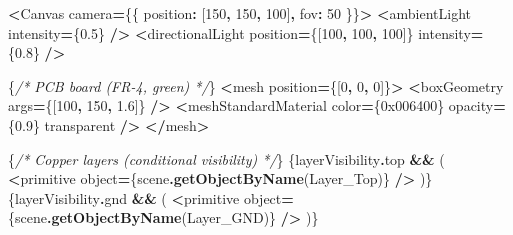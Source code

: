 \documentclass[
]{article}
\newenvironment{Shaded}{\begin{snugshade}}{\end{snugshade}}
\newcommand{\AttributeTok}[1]{\textcolor[rgb]{0.13,0.29,0.53}{#1}}
\newcommand{\BaseNTok}[1]{\textcolor[rgb]{0.00,0.00,0.81}{#1}}
\newcommand{\CommentTok}[1]{\textcolor[rgb]{0.56,0.35,0.01}{\textit{#1}}}
\newcommand{\DataTypeTok}[1]{\textcolor[rgb]{0.13,0.29,0.53}{#1}}
\newcommand{\DecValTok}[1]{\textcolor[rgb]{0.00,0.00,0.81}{#1}}
\newcommand{\FloatTok}[1]{\textcolor[rgb]{0.00,0.00,0.81}{#1}}
\newcommand{\FunctionTok}[1]{\textcolor[rgb]{0.13,0.29,0.53}{\textbf{#1}}}
\newcommand{\NormalTok}[1]{#1}
\newcommand{\OperatorTok}[1]{\textcolor[rgb]{0.81,0.36,0.00}{\textbf{#1}}}
\newcommand{\StringTok}[1]{\textcolor[rgb]{0.31,0.60,0.02}{#1}}
\begin{document}
\begin{Shaded}
\begin{Highlighting}[]
      \OperatorTok{\textless{}}\NormalTok{Canvas camera}\OperatorTok{=}\NormalTok{\{\{ position}\OperatorTok{:}\NormalTok{ [}\DecValTok{150}\OperatorTok{,} \DecValTok{150}\OperatorTok{,} \DecValTok{100}\NormalTok{]}\OperatorTok{,}\NormalTok{ fov}\OperatorTok{:} \DecValTok{50}\NormalTok{ \}\}}\OperatorTok{\textgreater{}}
        \OperatorTok{\textless{}}\NormalTok{ambientLight intensity}\OperatorTok{=}\NormalTok{\{}\FloatTok{0.5}\NormalTok{\} }\OperatorTok{/\textgreater{}}
        \OperatorTok{\textless{}}\NormalTok{directionalLight position}\OperatorTok{=}\NormalTok{\{[}\DecValTok{100}\OperatorTok{,} \DecValTok{100}\OperatorTok{,} \DecValTok{100}\NormalTok{]\} intensity}\OperatorTok{=}\NormalTok{\{}\FloatTok{0.8}\NormalTok{\} }\OperatorTok{/\textgreater{}}

\NormalTok{        \{}\CommentTok{/* PCB board (FR{-}4, green) */}\NormalTok{\}}
        \OperatorTok{\textless{}}\NormalTok{mesh position}\OperatorTok{=}\NormalTok{\{[}\DecValTok{0}\OperatorTok{,} \DecValTok{0}\OperatorTok{,} \DecValTok{0}\NormalTok{]\}}\OperatorTok{\textgreater{}}
          \OperatorTok{\textless{}}\NormalTok{boxGeometry args}\OperatorTok{=}\NormalTok{\{[}\DecValTok{100}\OperatorTok{,} \DecValTok{150}\OperatorTok{,} \FloatTok{1.6}\NormalTok{]\} }\OperatorTok{/\textgreater{}}
          \OperatorTok{\textless{}}\NormalTok{meshStandardMaterial color}\OperatorTok{=}\NormalTok{\{}\BaseNTok{0x006400}\NormalTok{\} opacity}\OperatorTok{=}\NormalTok{\{}\FloatTok{0.9}\NormalTok{\} transparent }\OperatorTok{/\textgreater{}}
        \OperatorTok{\textless{}/}\NormalTok{mesh}\OperatorTok{\textgreater{}}

\NormalTok{        \{}\CommentTok{/* Copper layers (conditional visibility) */}\NormalTok{\}}
\NormalTok{        \{layerVisibility}\OperatorTok{.}\AttributeTok{top} \OperatorTok{\&\&}\NormalTok{ (}
          \OperatorTok{\textless{}}\NormalTok{primitive }\DataTypeTok{object}\OperatorTok{=}\NormalTok{\{scene}\OperatorTok{.}\FunctionTok{getObjectByName}\NormalTok{(}\StringTok{\textquotesingle{}Layer\_Top\textquotesingle{}}\NormalTok{)\} }\OperatorTok{/\textgreater{}}
\NormalTok{        )\}}
\NormalTok{        \{layerVisibility}\OperatorTok{.}\AttributeTok{gnd} \OperatorTok{\&\&}\NormalTok{ (}
          \OperatorTok{\textless{}}\NormalTok{primitive }\DataTypeTok{object}\OperatorTok{=}\NormalTok{\{scene}\OperatorTok{.}\FunctionTok{getObjectByName}\NormalTok{(}\StringTok{\textquotesingle{}Layer\_GND\textquotesingle{}}\NormalTok{)\} }\OperatorTok{/\textgreater{}}
\NormalTok{        )\}}


\end{Highlighting}
\end{Shaded}
\end{document}
